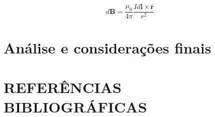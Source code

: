 \documentclass[
	article,			%
	11pt,				%
	oneside,			%
	a4paper,			%
	english,			%
	brazil,				%
	sumario=tradicional
	]{abntex2}
\begin{document}
\begin{equation} \label{eq:biot-savart}
	d\textbf{B} = \frac{\mu_0}{4\pi} \frac{Id\textbf{l} \times \hat{\textbf{r}}}{r^2}
\end{equation}



\section{Análise e considerações finais}

\section{REFERÊNCIAS BIBLIOGRÁFICAS}
\end{document}
